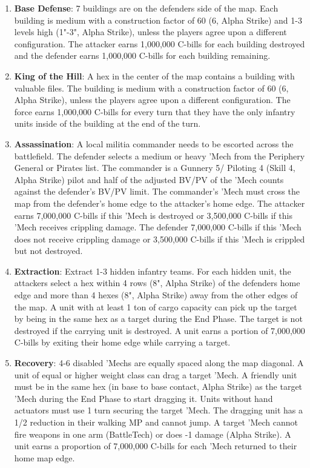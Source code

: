 \begin{enumerate}
\item {\bfseries Base Defense}: 7 buildings are on the defenders side of the map.
Each building is medium with a construction factor of 60 (6, Alpha Strike) and 1-3 levels high (1"-3", Alpha Strike), unless the players agree upon a different configuration.
The attacker earns 1,000,000 C-bills for each building destroyed and the defender earns 1,000,000 C-bills for each building remaining.

\item {\bfseries King of the Hill}: A hex in the center of the map contains a building with valuable files.
The building is medium with a construction factor of 60 (6, Alpha Strike), unless the players agree upon a different configuration.
The force earns 1,000,000 C-bills for every turn that they have the only infantry units inside of the building at the end of the turn.

\item {\bfseries Assassination}: A local militia commander needs to be escorted across the battlefield.
The defender selects a medium or heavy 'Mech from the Periphery General or Pirates list.
The commander is a Gunnery 5/ Piloting 4 (Skill 4, Alpha Strike) pilot and half of the adjusted BV/PV of the 'Mech counts against the defender's BV/PV limit.
The commander's 'Mech must cross the map from the defender's home edge to the attacker's home edge.
The attacker earns 7,000,000 C-bills if this 'Mech is destroyed or 3,500,000 C-bills if this 'Mech receives crippling damage.
The defender 7,000,000 C-bills if this 'Mech does not receive crippling damage or 3,500,000 C-bills if this 'Mech is crippled but not destroyed.

\item {\bfseries Extraction}: Extract 1-3 hidden infantry teams.
For each hidden unit, the attackers select a hex within 4 rows (8", Alpha Strike) of the defenders home edge and more than 4 hexes (8", Alpha Strike) away from the other edges of the map.
A unit with at least 1 ton of cargo capacity can pick up the target by being in the same hex as a target during the End Phase.
The target is not destroyed if the carrying unit is destroyed.
A unit earns a portion of 7,000,000 C-bills by exiting their home edge while carrying a target.

\item {\bfseries Recovery}: 4-6 disabled 'Mechs are equally spaced along the map diagonal.
A unit of equal or higher weight class can drag a target 'Mech.
A friendly unit must be in the same hex (in base to base contact, Alpha Strike) as the target 'Mech during the End Phase to start dragging it.
Units without hand actuators must use 1 turn securing the target 'Mech.
The dragging unit has a 1/2 reduction in their walking MP and cannot jump.
A target 'Mech cannot fire weapons in one arm (BattleTech) or does -1 damage (Alpha Strike).
A unit earns a proportion of 7,000,000 C-bills for each 'Mech returned to their home map edge.

\end{enumerate}

